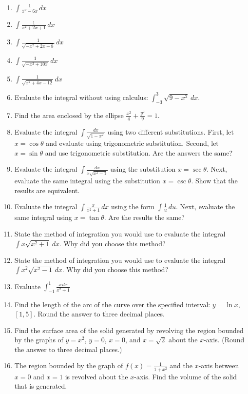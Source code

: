 \documentclass{exercises}
\begin{document}
\begin{enumerate}[resume]
\item $\int \frac{1}{x^{2}-6x}\,dx$
\item $\int \frac{1}{x^{2}+2x+1}\,dx$
\item $\int \frac{1}{\sqrt{-x^{2}+2x+8}}\,dx$
\item $\int \frac{1}{\sqrt{-x^{2}+10x}}\,dx$
\item $\int \frac{1}{\sqrt{x^{2}+4x-12}}\,dx$
\item Evaluate the integral without using calculus: $\int_{-3}^{3}\sqrt{9-x^{2}}\,dx$.
\item Find the area enclosed by the ellipse $\frac{x^{2}}{4}+\frac{y^{2}}{9}=1$.
\item Evaluate the integral $\int \frac{dx}{\sqrt{1-x^{2}}}$ using two different substitutions. First, let $x=\cos \theta$ and evaluate using trigonometric substitution. Second, let $x=\sin \theta$ and use trigonometric substitution. Are the answers the same?
\item Evaluate the integral $\int \frac{dx}{x\sqrt{x^{2}-1}}$ using the substitution $x=\sec \theta$. Next, evaluate the same integral using the substitution $x=\csc \theta$. Show that the results are equivalent.
\item Evaluate the integral $\int \frac{x}{x^{2}+1}\,dx$ using the form $\int \frac{1}{u}\,du$. Next, evaluate the same integral using $x=\tan \theta$. Are the results the same?
\item State the method of integration you would use to evaluate the integral $\int x\sqrt{x^{2}+1}\,dx$. Why did you choose this method?
\item State the method of integration you would use to evaluate the integral $\int x^{2}\sqrt{x^{2}-1}\,dx$. Why did you choose this method?
\item Evaluate $\int_{-1}^{1}\frac{x\,dx}{x^{2}+1}$
\item Find the length of the arc of the curve over the specified interval: $y=\ln x$, $[1,5]$. Round the answer to three decimal places.
\item Find the surface area of the solid generated by revolving the region bounded by the graphs of $y=x^{2}$, $y=0$, $x=0$, and $x=\sqrt{2}$ about the $x$-axis. (Round the answer to three decimal places.)
\item The region bounded by the graph of $f(x)=\frac{1}{1+x^{2}}$ and the $x$-axis between $x=0$ and $x=1$ is revolved about the $x$-axis. Find the volume of the solid that is generated.
\end{enumerate}
\end{document}
